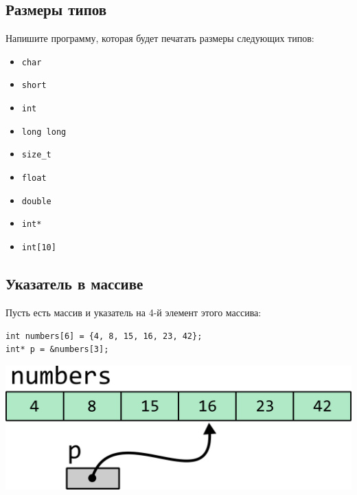 \documentclass{article}
\begin{document}
\subsection{Размеры типов}
Напишите программу, которая будет печатать размеры следующих типов:
\begin{multicols}{3}
\begin{itemize}
\item \texttt{char}
\item \texttt{short}
\item \texttt{int}
\item \texttt{long long}
\item \texttt{size\_t}
\item \texttt{float}
\item \texttt{double}
\item \texttt{int*}
\item \texttt{int[10]}
\end{itemize}
\end{multicols}

\subsection{Указатель в массиве}
Пусть есть массив и указатель на 4-й элемент этого массива:
\begin{lstlisting}
int numbers[6] = {4, 8, 15, 16, 23, 42};
int* p = &numbers[3];
\end{lstlisting}

\begin{center}
\includegraphics[scale=0.7]{../images/pointer_task_arithmetics.png}
\end{center}
\end{document}
